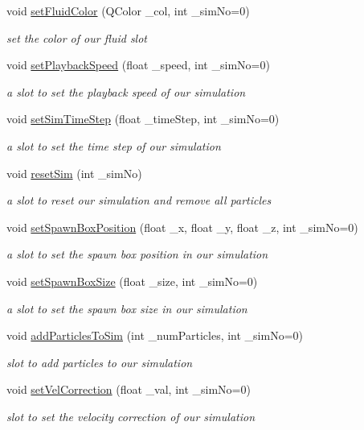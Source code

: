 \begin{DoxyCompactItemize}
void \hyperlink{class_open_g_l_widget_a559ba717c412258c234ce5865c0b6976}{set\-Fluid\-Color} (Q\-Color \-\_\-col, int \-\_\-sim\-No=0)
\begin{DoxyCompactList}\small\item\em set the color of our fluid slot \end{DoxyCompactList}\item 
void \hyperlink{class_open_g_l_widget_a3c415ea6ecc1ccf6df49b08df74bbd1a}{set\-Playback\-Speed} (float \-\_\-speed, int \-\_\-sim\-No=0)
\begin{DoxyCompactList}\small\item\em a slot to set the playback speed of our simulation \end{DoxyCompactList}\item 
void \hyperlink{class_open_g_l_widget_ac8a71d325740372032c0061d3bf1daa0}{set\-Sim\-Time\-Step} (float \-\_\-time\-Step, int \-\_\-sim\-No=0)
\begin{DoxyCompactList}\small\item\em a slot to set the time step of our simulation \end{DoxyCompactList}\item 
void \hyperlink{class_open_g_l_widget_acc54210918549bd628db0080d576b483}{reset\-Sim} (int \-\_\-sim\-No)
\begin{DoxyCompactList}\small\item\em a slot to reset our simulation and remove all particles \end{DoxyCompactList}\item 
void \hyperlink{class_open_g_l_widget_ac4d67ea702f268f7d072e94a569cb5f0}{set\-Spawn\-Box\-Position} (float \-\_\-x, float \-\_\-y, float \-\_\-z, int \-\_\-sim\-No=0)
\begin{DoxyCompactList}\small\item\em a slot to set the spawn box position in our simulation \end{DoxyCompactList}\item 
void \hyperlink{class_open_g_l_widget_a60e5e6f2845384c3faeaa11c0fb800b4}{set\-Spawn\-Box\-Size} (float \-\_\-size, int \-\_\-sim\-No=0)
\begin{DoxyCompactList}\small\item\em a slot to set the spawn box size in our simulation \end{DoxyCompactList}\item 
void \hyperlink{class_open_g_l_widget_adce23eb4fa8b5a1d1ac0403c911abb37}{add\-Particles\-To\-Sim} (int \-\_\-num\-Particles, int \-\_\-sim\-No=0)
\begin{DoxyCompactList}\small\item\em slot to add particles to our simulation \end{DoxyCompactList}\item 
void \hyperlink{class_open_g_l_widget_a9ca3397753dcfbc56ada94d1e91000ed}{set\-Vel\-Correction} (float \-\_\-val, int \-\_\-sim\-No=0)
\begin{DoxyCompactList}\small\item\em slot to set the velocity correction of our simulation \end{DoxyCompactList}\end{DoxyCompactItemize}

